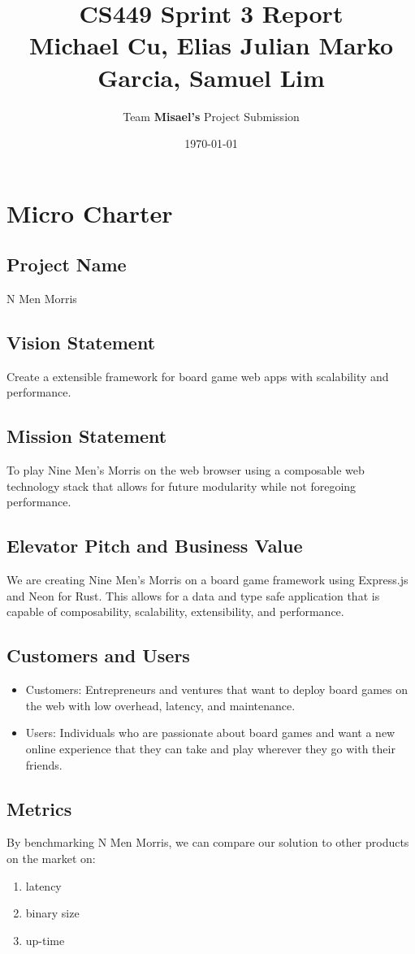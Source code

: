 \documentclass[11pt]{article}
\author{Team \textbf{Misael's} Project Submission}
\date{\today}
\title{CS449 Sprint 3 Report\\\medskip
\large Michael Cu, Elias Julian Marko Garcia, Samuel Lim}
\begin{document}
\maketitle
\tableofcontents


\section{Micro Charter}
\label{sec:org362aa90}
\subsection{Project Name}
\label{sec:org6b0ded8}
N Men Morris
\subsection{Vision Statement}
\label{sec:org14d18ed}
Create a extensible framework for board game web apps with scalability and performance.
\subsection{Mission Statement}
\label{sec:org7b820f8}
To play Nine Men's Morris on the web browser using a composable web technology stack that allows
for future modularity while not foregoing performance.
\subsection{Elevator Pitch and Business Value}
\label{sec:org7e32522}
We are creating Nine Men's Morris on a board game framework using Express.js and Neon for
Rust. This allows for a data and type safe application that is capable of composability,
scalability, extensibility, and performance.
\subsection{Customers and Users}
\label{sec:org99618b2}
\begin{itemize}
\item Customers: Entrepreneurs and ventures that want to deploy board games on the web with low
overhead, latency, and maintenance.
\item Users: Individuals who are passionate about board games and want a new online experience that
they can take and play wherever they go with their friends.
\end{itemize}
\subsection{Metrics}
\label{sec:orgc24f6b4}
By benchmarking N Men Morris, we can compare our solution to other products on the market on:
\begin{enumerate}
\item latency
\item binary size
\item up-time
\end{enumerate}
\end{document}
